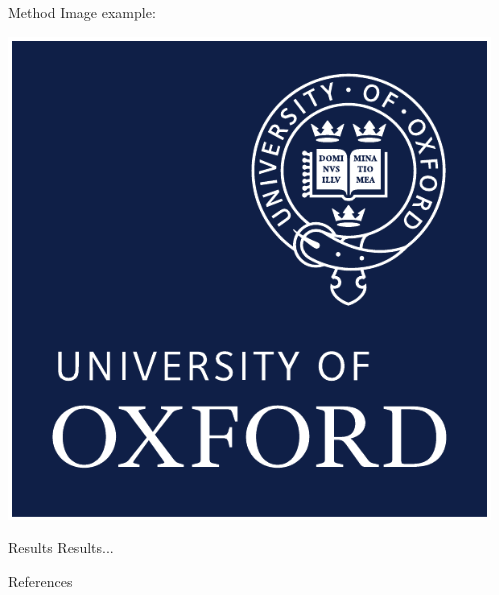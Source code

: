\documentclass[final,hyperref={pdfpagelabels=false}]{beamer}
\begin{document}
\begin{frame}[t]
\begin{columns}[t]
\begin{column}{.45\textwidth}
\begin{block}{\Large Method}
        Image example:
        \begin{center}
          \includegraphics[width=0.9\columnwidth]{ox_brand_cmyk_rev}
        \end{center}
      \end{block}

      \begin{block}{\Large Results}
        Results...
      \end{block}

      \begin{block}{\Large References}
        \nocite{*} %
        \linespread{0.928}\selectfont
        \footnotesize{
          }
      \end{block}

    \end{column} %

    
    \begin{column}{.02\textwidth}\end{column} %

  \end{columns} %
\end{frame} %
\end{document}
